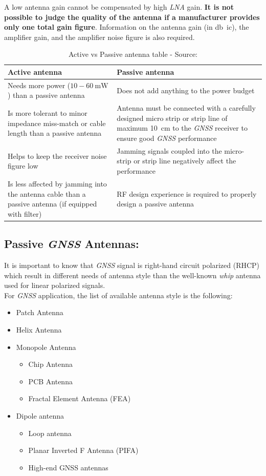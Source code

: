 \documentclass[report.tex]{subfiles}
\begin{document}
A low antenna gain cannot be compensated by high \textit{LNA} gain. \textbf{It is not possible to judge the quality of the antenna if a manufacturer provides only one total gain figure}. Information on the antenna gain (in \si{\decibel ic}), the amplifier gain, and the amplifier noise figure is also required.

\begin{table}[H]
\centering
\begin{tabularx}{\textwidth}{|X|X|}\hline
\textbf{Active antenna} & \textbf{Passive antenna}\\\hline\hline
Needs more power ($10 - \SI{60}{\milli\watt}$) than a passive antenna   & Does not add anything to the power budget \\\hline
Is more tolerant to minor impedance miss-match or cable length than a passive antenna & Antenna must be connected with a carefully designed micro strip or strip line of maximum \SI{10}{\centi\meter} to the \textit{GNSS} receiver to ensure good \textit{GNSS} performance \\\hline
Helps to keep the receiver noise figure low & Jamming signals coupled into the micro-strip or strip line negatively affect the performance \\\hline
Is less affected by jamming into the antenna cable than a passive antenna (if equipped with filter) & RF design experience is required to properly design a passive antenna \\\hline
\end{tabularx}
\caption{Active vs Passive antenna table - Source:\cite{gnss_ant_intro}}
\label{tab:modem}
\end{table}

\subsection{Passive \textit{GNSS} Antennas:}

It is important to know that \textit{GNSS} signal is right-hand circuit polarized (RHCP) which result in different needs of antenna style than the well-known \textit{whip} antenna used for linear polarized signals.\\

For \textit{GNSS} application, the list of available antenna style is the following:
\begin{itemize}
\item Patch Antenna
\item Helix Antenna
\item Monopole Antenna
\begin{itemize}
\item Chip Antenna
\item PCB Antenna
\item Fractal Element Antenna (FEA)
\end{itemize}
\item Dipole antenna
\begin{itemize}
\item Loop antenna
\item Planar Inverted F Antenna (PIFA)
\item High-end GNSS antennas
\end{itemize}
\end{itemize}
\end{document}
